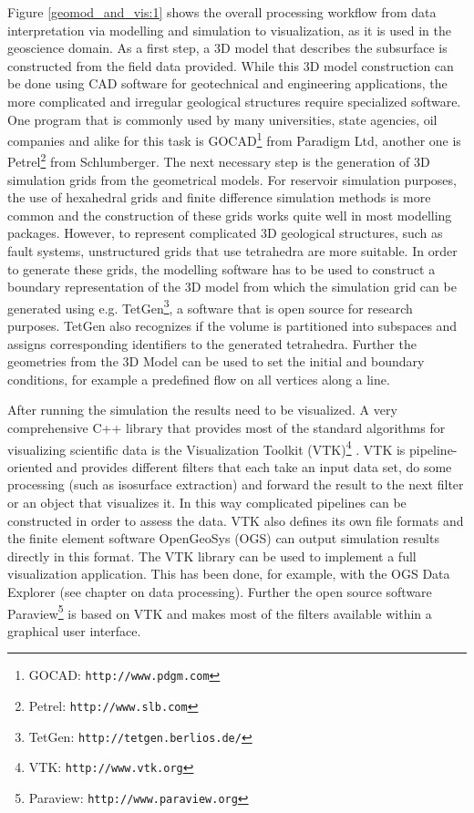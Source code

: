Figure \ref{geomod_and_vis:1} shows the overall processing workflow from data interpretation via modelling and simulation to visualization, as it is used in the geoscience domain. As a first step, a 3D model that describes the subsurface is constructed from the field data provided. While this 3D model construction can be done using CAD software for geotechnical and engineering applications, the more complicated and irregular geological structures require specialized software. One program that is commonly used by many universities, state agencies, oil companies and alike for this task is GOCAD\footnote{GOCAD: \texttt{http://www.pdgm.com}} from Paradigm Ltd, another one is Petrel\footnote{Petrel: \texttt{http://www.slb.com}} from Schlumberger. The next necessary step is the generation of 3D simulation grids from the geometrical models. For reservoir simulation purposes, the use of hexahedral grids and finite difference simulation methods is more common and the construction of these grids works quite well in most modelling packages. However, to represent complicated 3D geological structures, such as fault systems, unstructured grids that use tetrahedra are more suitable. In order to generate these grids, the modelling software has to be used to construct a boundary representation of the 3D model from which the simulation grid can be generated using e.g. TetGen\footnote{TetGen: \texttt{http://tetgen.berlios.de/}}, a software that is open source for research purposes. TetGen also recognizes if the volume is partitioned into subspaces and assigns corresponding identifiers to the generated tetrahedra. Further the geometries from the 3D Model can be used to set the initial and boundary conditions, for example a predefined flow on all vertices along a line.

After running the simulation the results need to be visualized. A very comprehensive C++ library that provides most of the standard algorithms for visualizing scientific data is the Visualization Toolkit (VTK)\footnote{VTK: \texttt{http://www.vtk.org}} \cite{Schroeder1996}. VTK is pipeline-oriented and provides different filters that each take an input data set, do some processing (such as isosurface extraction) and forward the result to the next filter or an object that visualizes it. In this way complicated pipelines can be constructed in order to assess the data. VTK also defines its own file formats and the finite element software OpenGeoSys (OGS) can output simulation results directly in this format. The VTK library can be used to implement a full visualization application. This has been done, for example, with the OGS Data Explorer (see chapter on data processing). Further the open source software Paraview\footnote{Paraview: \texttt{http://www.paraview.org}} is based on VTK and makes most of the filters available within a graphical user interface.

